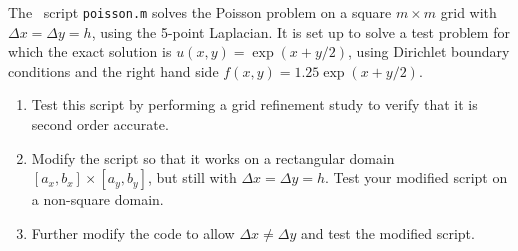 

The \matlab\ script {\tt poisson.m} solves the Poisson problem on a square
$m\times m$ grid with $\Delta x = \Delta y = h$, using the 5-point
Laplacian.  It is set up to solve a test problem for which the exact
solution is $u(x,y) = \exp(x+y/2)$, using Dirichlet boundary conditions and
the right hand side $f(x,y) = 1.25 \exp(x+y/2)$.

\begin{enumerate} 
\item Test this script by performing a grid refinement study to verify that
it is second order accurate.

\item Modify the script so that it works on a rectangular domain $[a_x,b_x]
\times [a_y,b_y]$, but still with $\Delta x = \Delta y = h$.  Test your
modified script on a non-square domain.

\item Further modify the code to allow $\Delta x \neq \Delta y$ and test the
modified script.
\end{enumerate} 
